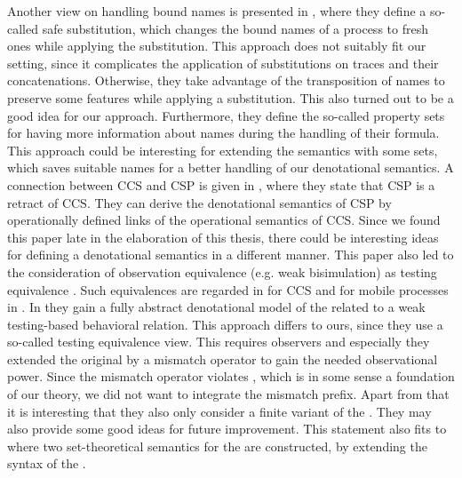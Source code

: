 Another view on handling bound names is presented in \cite{caires}, where they define a so-called safe substitution, which changes the bound names of a process to fresh ones while applying the substitution. This approach does not suitably fit our setting, since it complicates the application of substitutions on traces and their concatenations. Otherwise, they take advantage of the transposition of names to preserve some features while applying a substitution. This also turned out to be a good idea for our approach. Furthermore, they define the so-called property sets for having more information about names during the handling of their formula. This approach could be interesting for extending the semantics with some sets, which saves suitable names for a better handling of our denotational semantics. A connection between CCS and CSP is given in \cite{cspRetract1,cspRetract2}, where they state that CSP is a retract of CCS. They can derive the denotational semantics of CSP by operationally defined links of the operational semantics of CCS. Since we found this paper late in the elaboration of this thesis, there could be interesting ideas for defining a denotational semantics in a different manner. This paper also led to the consideration of observation equivalence (e.g. weak bisimulation) as testing equivalence \cite{testEquiv}. Such equivalences are regarded in \cite{testingCCS} for CCS and for mobile processes in \cite{testingCSP}. In \cite{testingCSP} they gain a fully abstract denotational model of the \picalc{} related to a weak testing-based behavioral relation. This approach differs to ours, since they use a so-called testing equivalence view. This requires observers and especially they extended the original \picalc{} by a mismatch operator to gain the needed observational power. Since the mismatch operator violates , which is in some sense a foundation of our theory, we did not want to integrate the mismatch prefix. Apart from that it is interesting that they also only consider a finite variant of the \picalc{}. They may also provide some good ideas for future improvement. This statement also fits to \cite{hennessy} where two set-theoretical semantics for the \picalc{} are constructed, by extending the syntax of the \picalc{}.

